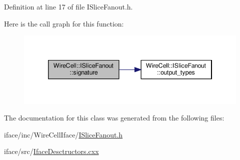 Definition at line 17 of file I\+Slice\+Fanout.\+h.

Here is the call graph for this function\+:
\nopagebreak
\begin{figure}[H]
\begin{center}
\leavevmode
\includegraphics[width=346pt]{class_wire_cell_1_1_i_slice_fanout_a7f2b90a58e2be888e25625e322f14c8d_cgraph}
\end{center}
\end{figure}


The documentation for this class was generated from the following files\+:\begin{DoxyCompactItemize}
\item 
iface/inc/\+Wire\+Cell\+Iface/\hyperlink{_i_slice_fanout_8h}{I\+Slice\+Fanout.\+h}\item 
iface/src/\hyperlink{_iface_desctructors_8cxx}{Iface\+Desctructors.\+cxx}\end{DoxyCompactItemize}
